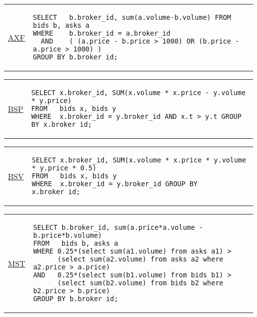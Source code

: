 \hspace{-5mm}\vspace{-8mm}
\begin{tabular}{lp{}}
\begin{rotate}{90}\hspace{-1cm}\underline{{\scriptsize AXF}}\end{rotate} &
{\scriptsize
\begin{verbatim}
SELECT   b.broker_id, sum(a.volume-b.volume) FROM bids b, asks a
WHERE    b.broker_id = a.broker_id
  AND    ( (a.price - b.price > 1000) OR (b.price - a.price > 1000) )
GROUP BY b.broker_id;
\end{verbatim}
}
\end{tabular}

\hspace{-5mm}\vspace{-8mm}
\begin{tabular}{lp{}}
\begin{rotate}{90}\hspace{-1cm}\underline{{\scriptsize BSP}}\end{rotate} &
{\scriptsize
\begin{verbatim}
SELECT x.broker_id, SUM(x.volume * x.price - y.volume * y.price)
FROM   bids x, bids y
WHERE  x.broker_id = y.broker_id AND x.t > y.t GROUP BY x.broker_id;
\end{verbatim}
}
\end{tabular}

\hspace{-5mm}\vspace{-8mm}
\begin{tabular}{lp{}}
\begin{rotate}{90}\hspace{-1cm}\underline{{\scriptsize BSV}}\end{rotate} &
{\scriptsize
\begin{verbatim}
SELECT x.broker_id, SUM(x.volume * x.price * y.volume * y.price * 0.5)
FROM   bids x, bids y
WHERE  x.broker_id = y.broker_id GROUP BY x.broker_id;
\end{verbatim}
}
\end{tabular}

\hspace{-5mm}\vspace{-8mm}
\begin{tabular}{lp{}}
\begin{rotate}{90}\hspace{-1cm}\underline{{\scriptsize MST}}\end{rotate} &
{\scriptsize
\begin{verbatim}
SELECT b.broker_id, sum(a.price*a.volume - b.price*b.volume)
FROM   bids b, asks a
WHERE 0.25*(select sum(a1.volume) from asks a1) >
      (select sum(a2.volume) from asks a2 where a2.price > a.price)
AND   0.25*(select sum(b1.volume) from bids b1) >
      (select sum(b2.volume) from bids b2 where b2.price > b.price)
GROUP BY b.broker_id;
\end{verbatim}
}
\end{tabular}

